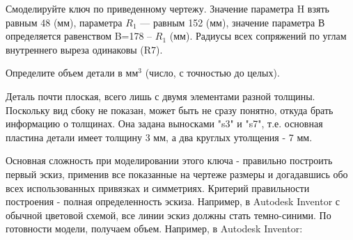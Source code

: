 
Смоделируйте ключ по приведенному чертежу. Значение параметра H взять равным 48 (мм), параметра $R_1$ — равным 152 (мм), 
значение параметра В определяется равенством B=178 – $R_1$ (мм).   Радиусы всех сопряжений по углам внутреннего выреза одинаковы (R7).


Определите объем детали в мм$^3$  (число, с точностью до целых).

\explanationSection

Деталь почти плоская, всего лишь с двумя элементами разной толщины. Поскольку вид сбоку не показан, может быть не сразу понятно, откуда брать информацию о толщинах. Она задана выносками "s3" и "s7", т.е. основная пластина детали имеет толщину 3 мм, а два круглых утолщения - 7 мм.

Основная сложность при моделировании этого ключа - правильно построить первый эскиз, применив все показанные на чертеже размеры и догадавшись обо всех использованных привязках и симметриях.  Критерий правильности построения - полная определенность эскиза. Например, в Autodesk Inventor с обычной цветовой схемой, все линии эскиз должны стать темно-синими.  По готовности модели, получаем объем. Например, в Autodesk Inventor:


